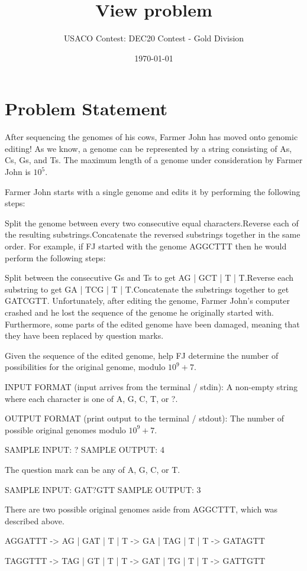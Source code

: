 \documentclass[12pt]{article}
\title{View problem}
\author{USACO Contest: DEC20 Contest - Gold Division}
\date{\today}
\begin{document}
\maketitle

\section*{Problem Statement}

After sequencing the genomes of his cows, Farmer John has moved onto genomic
editing! As we know, a genome can be represented by a string consisting of As,
Cs, Gs, and Ts.  The maximum length of a genome under consideration by Farmer
John is $10^5$. 

Farmer John starts with a single genome and edits it by performing the following
steps:

Split the genome between every two consecutive equal characters.Reverse each of the resulting substrings.Concatenate the reversed substrings together in the same order.
For example, if FJ started with the genome AGGCTTT then he would perform the
following steps:

Split between the consecutive Gs and Ts to get AG | GCT | T | T.Reverse each substring to get GA | TCG | T | T.Concatenate the substrings together to get GATCGTT.
Unfortunately, after editing the genome, Farmer John's computer crashed and he
lost the sequence of the genome he originally started with. Furthermore, some 
parts of the edited genome have been damaged, meaning that they have been 
replaced by question marks.

Given the sequence of the edited genome, help FJ determine the number of 
possibilities for the original genome, modulo $10^9+7$.

INPUT FORMAT (input arrives from the terminal / stdin):
A non-empty string where each character is one of A, G, C, T, or ?.

OUTPUT FORMAT (print output to the terminal / stdout):
The number of possible original genomes modulo $10^9+7$.

SAMPLE INPUT:
?
SAMPLE OUTPUT: 
4

The question mark can be any of A, G, C, or T.

SAMPLE INPUT:
GAT?GTT
SAMPLE OUTPUT: 
3

There are two possible original genomes aside from AGGCTTT, which was described
above.


AGGATTT -> AG | GAT | T | T -> GA | TAG | T | T -> GATAGTT

TAGGTTT -> TAG | GT | T | T -> GAT | TG | T | T -> GATTGTT
\end{document}
